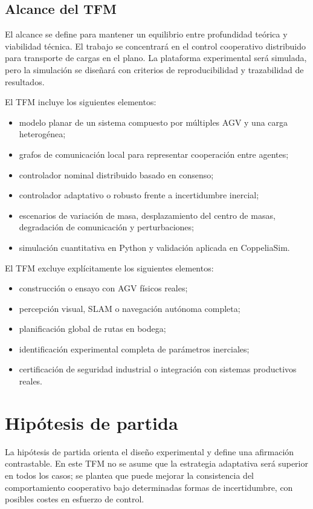 \documentclass[12pt,a4paper]{article}
\begin{document}
\subsection{Alcance del TFM}

El alcance se define para mantener un equilibrio entre profundidad teórica y viabilidad técnica. El trabajo se concentrará en el control cooperativo distribuido para transporte de cargas en el plano. La plataforma experimental será simulada, pero la simulación se diseñará con criterios de reproducibilidad y trazabilidad de resultados.

El TFM incluye los siguientes elementos:
\begin{itemize}
  \item modelo planar de un sistema compuesto por múltiples AGV y una carga heterogénea;
  \item grafos de comunicación local para representar cooperación entre agentes;
  \item controlador nominal distribuido basado en consenso;
  \item controlador adaptativo o robusto frente a incertidumbre inercial;
  \item escenarios de variación de masa, desplazamiento del centro de masas, degradación de comunicación y perturbaciones;
  \item simulación cuantitativa en Python y validación aplicada en CoppeliaSim.
\end{itemize}

El TFM excluye explícitamente los siguientes elementos:
\begin{itemize}
  \item construcción o ensayo con AGV físicos reales;
  \item percepción visual, SLAM o navegación autónoma completa;
  \item planificación global de rutas en bodega;
  \item identificación experimental completa de parámetros inerciales;
  \item certificación de seguridad industrial o integración con sistemas productivos reales.
\end{itemize}

\section{Hipótesis de partida}

La hipótesis de partida orienta el diseño experimental y define una afirmación contrastable. En este TFM no se asume que la estrategia adaptativa será superior en todos los casos; se plantea que puede mejorar la consistencia del comportamiento cooperativo bajo determinadas formas de incertidumbre, con posibles costes en esfuerzo de control.
\end{document}
